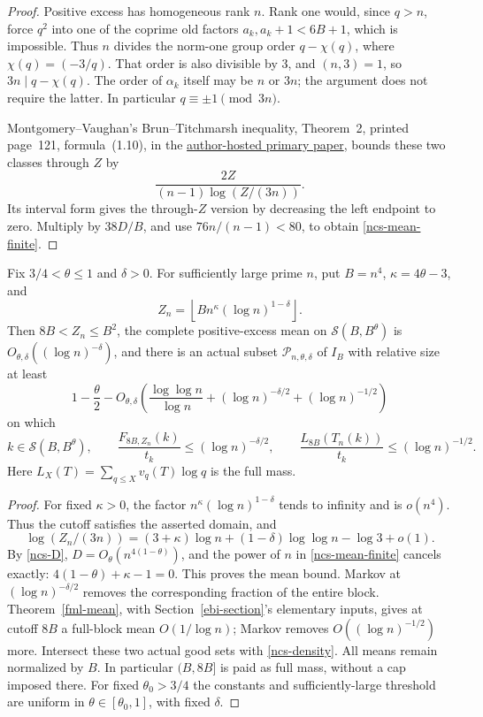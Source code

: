 \begin{proof}
Positive excess has homogeneous rank \(n\). Rank one would,
since \(q>n\), force \(q^2\) into one of the coprime old factors
\(a_k,a_k+1<6B+1\), which is impossible. Thus \(n\) divides
the norm-one group order \(q-\chi(q)\), where
\(\chi(q)=(-3/q)\). That order is also divisible by 3, and
\((n,3)=1\), so \(3n\mid q-\chi(q)\). The order of
\(\alpha_k\) itself may be \(n\) or \(3n\); the argument does
not require the latter. In particular \(q\equiv\pm1\pmod{3n}\).

Montgomery--Vaughan's Brun--Titchmarsh inequality, Theorem~2,
printed page~121, formula~(1.10), in the
\href{https://personal.science.psu.edu/rcv4/personal/Publications/large_sieve.pdf}
{author-hosted primary paper}, bounds these two classes through
\(Z\) by
\[
 \frac{2Z}{(n-1)\log(Z/(3n))}.
\]
Its interval form gives the through-\(Z\) version by decreasing
the left endpoint to zero. Multiply by \(38D/B\), and use
\(76n/(n-1)<80\), to obtain \eqref{ncs-mean-finite}.
\end{proof}

\begin{theorem}\label{ncs-tradeoff}
Fix \(3/4<\theta\leq1\) and \(\delta>0\). For sufficiently
large prime \(n\), put \(B=n^4\), \(\kappa=4\theta-3\), and
\[
 Z_n=\left\lfloor Bn^\kappa(\log n)^{1-\delta}\right\rfloor.
\]
Then \(8B<Z_n\leq B^2\), the complete positive-excess mean on
\(\mathcal S(B,B^\theta)\) is \(O_{\theta,\delta}((\log n)^{-\delta})\),
and there is an actual subset \(\mathcal P_{n,\theta,\delta}\)
of \(I_B\) with relative size at least
\[
 1-\frac\theta2-
 O_{\theta,\delta}\!\left(\frac{\log\log n}{\log n}
              +(\log n)^{-\delta/2}+(\log n)^{-1/2}\right)
\]
on which
\[
 k\in\mathcal S(B,B^\theta),\qquad
 \frac{F_{8B,Z_n}(k)}{t_k}\leq(\log n)^{-\delta/2},\qquad
 \frac{L_{8B}(T_n(k))}{t_k}\leq(\log n)^{-1/2}.
\]
Here \(L_X(T)=\sum_{q\leq X}v_q(T)\log q\) is the full mass.
\end{theorem}
\begin{proof}
For fixed \(\kappa>0\), the factor
\(n^\kappa(\log n)^{1-\delta}\) tends to infinity and is
\(o(n^4)\). Thus the cutoff satisfies the asserted domain, and
\[
 \log(Z_n/(3n))=(3+\kappa)\log n
                 +(1-\delta)\log\log n-\log3+o(1).
\]
By \eqref{ncs-D}, \(D=O_\theta(n^{4(1-\theta)})\), and the
power of \(n\) in \eqref{ncs-mean-finite} cancels exactly:
\(4(1-\theta)+\kappa-1=0\). This proves the mean bound.
Markov at \((\log n)^{-\delta/2}\) removes the corresponding
fraction of the entire block. Theorem~\ref{fml-mean}, with
Section~\ref{ebi-section}'s elementary inputs, gives at cutoff
\(8B\) a full-block mean \(O(1/\log n)\); Markov removes
\(O((\log n)^{-1/2})\) more. Intersect these two actual good
sets with \eqref{ncs-density}. All means remain normalized by
\(B\). In particular \((B,8B]\) is paid as full mass, without
a cap imposed there. For fixed \(\theta_0>3/4\) the constants
and sufficiently-large threshold are uniform in
\(\theta\in[\theta_0,1]\), with fixed \(\delta\).
\end{proof}

